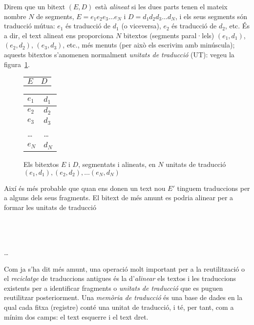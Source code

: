 Direm que un bitext $(E,D)$ està \emph{alineat} si les dues parts
tenen el mateix nombre $N$ de segments, $E= e_1 e_2 e_3 \ldots e_N$ i
$D= d_1 d_2 d_3 \ldots d_N$, i els seus segments són traducció mútua:
$e_1$ és traducció de $d_1$ (o viceversa), $e_2$ és traducció de
$d_2$, etc. És a dir, el text alineat ens proporciona $N$ bitextos
(segments paral·lels) $(e_1,d_1)$, $(e_2,d_2)$, $(e_3,d_3)$, etc., més
menuts (per això els escrivim amb minúscula); aquests bitextos
s'anomenen normalment \emph{unitats de traducció} (UT): vegeu la
figura~\ref{fg:alineat}.
\begin{figure}
  \begin{center}
    \begin{tabular}{p{3cm}p{3cm}}
           $E$ & $D$      
    \end{tabular}
    \begin{tabular}{|p{3cm}|p{3cm}|}
\hline
        $e_1$ & $d_1$ \\\hline
        $e_2$ & $d_2$ \\\hline
        $e_3$ & $d_3$ \\\hline
        \ldots & \ldots \\\hline
        $e_N$ & $d_N$ \\\hline
    \end{tabular}
  \end{center}
  \caption{Els bitextos $E$ i $D$, segmentats i alineats, en $N$
    unitats de traducció $(e_1,d_1), (e_2,d_2), \ldots (e_N,d_N)$}
  \label{fg:alineat}
\end{figure}



Així és més probable que quan ens donen un text nou $E'$ tinguem
traduccions per a alguns dels seus fragments. El bitext de més amunt
es podria alinear per a formar les unitats de traducció
\begin{center}
\\ 
\\ 
\\ 
\ldots\\ 
\end{center}

Com ja s'ha dit més amunt, una operació molt important per a la
reutilització o el \emph{reciclatge} de traduccions antigues és la
d'\emph{alinear} els textos i les traduccions existents per a
identificar fragments o \emph{unitats de traducció} que es puguen
reutilitzar posteriorment.  Una \emph{memòria de traducció} és una
base de dades en la qual cada fitxa (registre) conté una unitat de
traducció, i té, per tant, com a mínim dos camps: el text esquerre i
el text dret.


